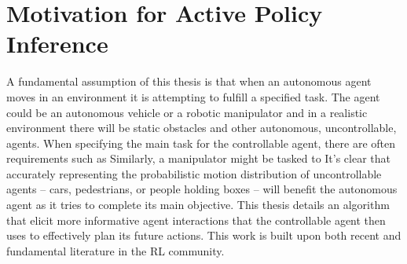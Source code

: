 %
%
\chapter{Motivation for Active Policy Inference}\label{chapt:motivation}

%
%
%
%

    A fundamental assumption of this thesis is that when an autonomous agent moves in an environment it is attempting to
    fulfill a specified task. The agent could be an autonomous vehicle or a robotic manipulator and in a realistic
    environment there will be static obstacles and other autonomous, uncontrollable, agents. When specifying the main
    task for the controllable agent, there are often requirements such as  Similarly, a manipulator might be tasked
    to  It's clear that
    accurately representing the probabilistic motion distribution of uncontrollable agents -- cars, pedestrians, or
    people holding boxes -- will benefit the autonomous agent as it tries to complete its main objective. This thesis
    details an algorithm that elicit more informative agent interactions that the controllable agent then uses to
    effectively plan its future actions. This work is built upon both recent and fundamental literature in the \ac{RL}
    community.

